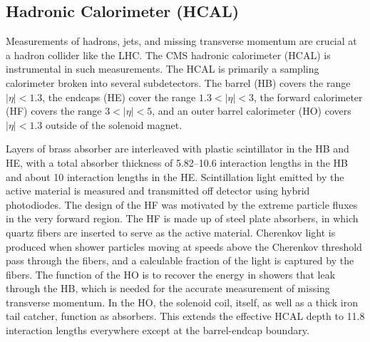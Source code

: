 \subsection{Hadronic Calorimeter (HCAL)}
Measurements of hadrons, jets, and missing transverse momentum are crucial at a hadron collider like the LHC. The CMS hadronic calorimeter (HCAL) is instrumental in such 
measurements. The HCAL is primarily a sampling calorimeter broken into several subdetectors. The barrel (HB) covers the range $|\eta| < 1.3$, the endcaps (HE) cover the range $1.3 < |\eta| < 3$, the forward calorimeter (HF) covers the range $3 < |\eta| < 5$, and an outer barrel calorimeter (HO) covers $|\eta| < 1.3$ outside of the solenoid magnet. 

Layers of brass absorber are interleaved with plastic scintillator in the HB and HE, with a total absorber thickness of 5.82--10.6 interaction lengths in the HB and about 10 interaction lengths in the HE. Scintillation light emitted by the active material is measured and transmitted off detector using hybrid photodiodes.
The design of the HF was motivated by the extreme particle fluxes in the very forward region. The HF is made up of steel plate absorbers, in which quartz fibers are inserted to serve as the active material. Cherenkov light is produced when shower particles moving at speeds above the Cherenkov threshold 
pass through the fibers, and a calculable fraction of the light is captured by the fibers. The function of the HO is to recover the energy in showers that leak through the HB, which is needed for the accurate measurement of missing transverse momentum. In the HO, the solenoid coil, itself, as well as a thick iron tail catcher, function 
as absorbers. This extends the effective HCAL depth to 11.8 interaction lengths everywhere except at the barrel-endcap boundary. 

